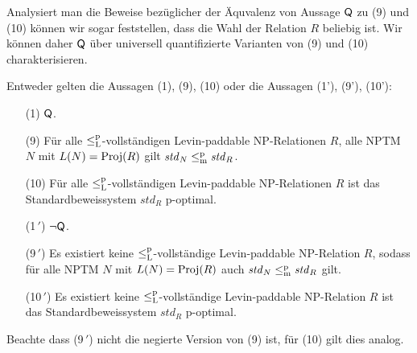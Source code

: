 Analysiert man die Beweise bezüglicher der Äquvalenz von Aussage $\mathsf{Q}$ zu (9) und (10) können wir sogar feststellen, dass die Wahl der Relation $R$ beliebig ist. 
Wir können daher $\mathsf{Q}$ über universell quantifizierte Varianten von (9) und (10) charakterisieren. 
\begin{theorem}
    Entweder gelten die Aussagen (1), (9), (10) oder die Aussagen (1'), (9'),  (10'):
    \begin{enumerate}
        \item[(1)] $\mathsf{Q}$.
        \item[(9)] Für alle $\leq_\mathrm{L}^\mathrm{p}$-vollständigen Levin-paddable NP-Relationen $R$, alle NPTM $N$ mit $L(N)=\operatorname{Proj}(R)$ gilt $\mathit{std}_N\leq_\mathrm{m}^\mathrm{p}\mathit{std}_R$.
        \item[(10)] Für alle $\leq_\mathrm{L}^\mathrm{p}$-vollständigen Levin-paddable NP-Relationen $R$ ist das Standardbeweissystem $\mathit{std}_R$ p-optimal.
        \item[(1$\,'$)] $\neg\mathsf{Q}$.
        \item[(9$\,'$)] Es existiert keine $\leq_\mathrm{L}^\mathrm{p}$-vollständige Levin-paddable NP-Relation $R$, sodass für alle NPTM $N$ mit $L(N)=\operatorname{Proj}(R)$ auch $\mathit{std}_N\leq_\mathrm{m}^\mathrm{p} \mathit{std}_R$ gilt.
        \item[(10$\,'$)] Es existiert keine $\leq_\mathrm{L}^\mathrm{p}$-vollständige Levin-paddable NP-Relation $R$ ist das Standardbeweissystem $\mathit{std}_R$ p-optimal.
    \end{enumerate}
    Beachte dass (9$\,'$) nicht die negierte Version von (9) ist, für (10) gilt dies analog.
\end{theorem}

